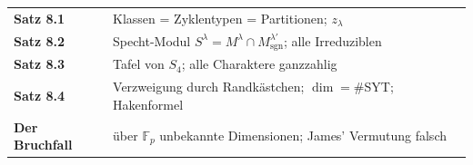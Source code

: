 \begin{merksatz}
\begin{center}
\renewcommand{\arraystretch}{1.5}
\begin{tabular}{@{}P{3.0cm}P{5.6cm}@{}}
\toprule
\textbf{Satz 8.1} & Klassen = Zyklentypen = Partitionen; $z_\lambda$\\
\textbf{Satz 8.2} & Specht-Modul $S^{\lambda} = M^{\lambda}\cap M^{\lambda'}_{\mathrm{sgn}}$; alle Irreduziblen\\
\textbf{Satz 8.3} & Tafel von $S_4$; alle Charaktere ganzzahlig\\
\textbf{Satz 8.4} & Verzweigung durch Randkästchen; $\dim = \#$SYT; Hakenformel\\
\textbf{Der Bruchfall} & über $\mathbb F_p$ unbekannte Dimensionen; James' Vermutung falsch\\
\bottomrule
\end{tabular}
\end{center}

\begin{center}
\begin{minipage}{0.88\textwidth}
\end{minipage}
\end{center}
\end{merksatz}
